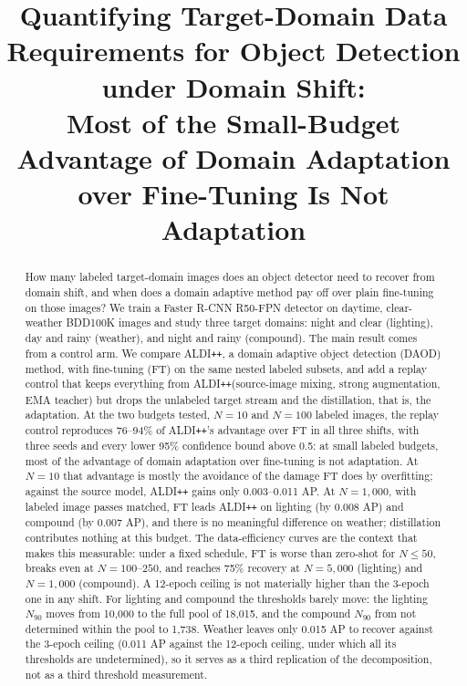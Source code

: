 \documentclass[conference]{IEEEtran}
\newcommand{\Nnf}{\ensuremath{N_{90}}\xspace}                 %
\newcommand{\aldi}{ALDI\texttt{++}\xspace}
\begin{document}
\title{Quantifying Target-Domain Data Requirements for Object Detection under Domain Shift:\\
Most of the Small-Budget Advantage of Domain Adaptation over Fine-Tuning Is Not Adaptation}

\author{
}

\maketitle

\begin{abstract}
How many labeled target-domain images does an object detector need to recover from domain shift, and when does a domain adaptive method pay off over plain fine-tuning on those images? We train a Faster R-CNN R50-FPN detector on daytime, clear-weather BDD100K images and study three target domains: night and clear (lighting), day and rainy (weather), and night and rainy (compound). The main result comes from a control arm. We compare \aldi, a domain adaptive object detection (DAOD) method, with fine-tuning (FT) on the same nested labeled subsets, and add a replay control that keeps everything from \aldi (source-image mixing, strong augmentation, EMA teacher) but drops the unlabeled target stream and the distillation, that is, the adaptation. At the two budgets tested, $N = 10$ and $N = 100$ labeled images, the replay control reproduces 76--94\% of \aldi's advantage over FT in all three shifts, with three seeds and every lower 95\% confidence bound above 0.5: at small labeled budgets, most of the advantage of domain adaptation over fine-tuning is not adaptation. At $N = 10$ that advantage is mostly the avoidance of the damage FT does by overfitting; against the source model, \aldi gains only 0.003--0.011 AP. At $N = 1{,}000$, with labeled image passes matched, FT leads \aldi on lighting (by 0.008 AP) and compound (by 0.007 AP), and there is no meaningful difference on weather; distillation contributes nothing at this budget. The data-efficiency curves are the context that makes this measurable: under a fixed schedule, FT is worse than zero-shot for $N \leq 50$, breaks even at $N = 100$--$250$, and reaches 75\% recovery at $N = 5{,}000$ (lighting) and $N = 1{,}000$ (compound). A 12-epoch ceiling is not materially higher than the 3-epoch one in any shift. For lighting and compound the thresholds barely move: the lighting \Nnf moves from 10,000 to the full pool of 18,015, and the compound \Nnf from not determined within the pool to 1,738. Weather leaves only 0.015 AP to recover against the 3-epoch ceiling (0.011 AP against the 12-epoch ceiling, under which all its thresholds are undetermined), so it serves as a third replication of the decomposition, not as a third threshold measurement.
\end{abstract}
\end{document}
